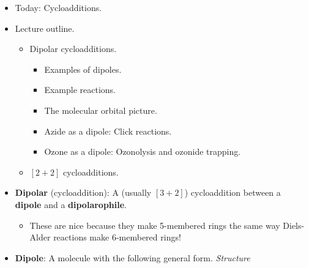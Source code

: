\documentclass[../notes.tex]{subfiles}
\begin{document}
\begin{itemize}
\begin{itemize}
\begin{itemize}
\begin{itemize}
                \item In particular, the EWG should be \emph{cis} to the "out" substituents.
            \end{itemize}
        \end{itemize}
        \item You \emph{will} need to know the reasons behind all of these reaction characteristics, i.e., you may be asked to derive them with orbital pictures on the exam.
        \begin{itemize}
            \item However, these shortcuts can help us on "predict the product"-type questions.
        \end{itemize}
    \end{itemize}
    \item Today: Cycloadditions.
    \item Lecture outline.
    \begin{itemize}
        \item Dipolar cycloadditions.
        \begin{itemize}
            \item Examples of dipoles.
            \item Example reactions.
            \item The molecular orbital picture.
            \item Azide as a dipole: Click reactions.
            \item Ozone as a dipole: Ozonolysis and ozonide trapping.
        \end{itemize}
        \item $[2+2]$ cycloadditions.
    \end{itemize}
    \pagebreak
    \item \textbf{Dipolar} (cycloaddition): A (usually $[3+2]$) cycloaddition between a \textbf{dipole} and a \textbf{dipolarophile}.
    \begin{itemize}
        \item These are nice because they make 5-membered rings the same way Diels-Alder reactions make 6-membered rings!
    \end{itemize}
    \item \textbf{Dipole}: A molecule with the following general form. \emph{Structure}
    \begin{figure}[h!]
        \centering
        \footnotesize

\end{figure}
\end{itemize}
\end{document}
